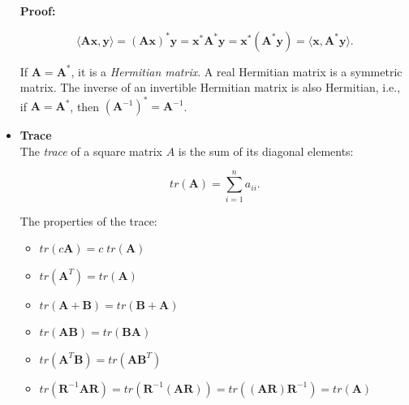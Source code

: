 \documentclass[10pt,b5paper,titlepage]{book}
\begin{document}
\begin{itemize}
        \textbf{Proof:}

        \begin{equation}
            \langle \mathbf{A}\mathbf{x}, \mathbf{y} \rangle
            = (\mathbf{A}\mathbf{x})^{*}\mathbf{y}
            = \mathbf{x}^{*}\mathbf{A}^{*}\mathbf{y}
            = \mathbf{x}^{*}(\mathbf{A}^{*}\mathbf{y})
            = \langle \mathbf{x}, \mathbf{A}^{*}\mathbf{y} \rangle
        .\end{equation}

        If $\mathbf{A} = \mathbf{A}^{*}$, it is a \textit{Hermitian matrix}.
        A real Hermitian matrix is a symmetric matrix. The inverse of an invertible
        Hermitian matrix is also Hermitian, i.e., if $\mathbf{A} = \mathbf{A}^{*}$,
        then $(\mathbf{A}^{-1})^{*} = \mathbf{A}^{-1}$.

    \item \textbf{Trace}\\

        The \textit{trace} of a square matrix $A$ is the sum of its diagonal elements:

        \begin{equation}
            tr(\mathbf{A}) = \sum_{i=1}^{n} a_{ii}
        .\end{equation}

        The properties of the trace:

        \begin{itemize}
            \item $tr(c \mathbf{A}) = c \; tr(\mathbf{A})$
            \item $tr(\mathbf{A}^{T}) = tr(\mathbf{A})$
            \item $tr(\mathbf{A} + \mathbf{B}) = tr(\mathbf{B} + \mathbf{A})$
            \item $tr(\mathbf{A} \mathbf{B}) = tr(\mathbf{B} \mathbf{A})$
            \item $tr(\mathbf{A}^{T} \mathbf{B}) = tr(\mathbf{A} \mathbf{B}^{T})$
            \item $tr(\mathbf{R}^{-1} \mathbf{A} \mathbf{R})
                = tr(\mathbf{R}^{-1}(\mathbf{A} \mathbf{R}))
                = tr((\mathbf{A} \mathbf{R}) \mathbf{R}^{-1})
                = tr(\mathbf{A})$
        \end{itemize}



\end{itemize}
\end{document}
